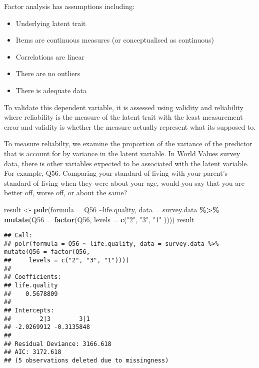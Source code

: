 \documentclass[
]{article}
\newenvironment{Shaded}{\begin{snugshade}}{\end{snugshade}}
\newcommand{\AttributeTok}[1]{\textcolor[rgb]{0.13,0.29,0.53}{#1}}
\newcommand{\FunctionTok}[1]{\textcolor[rgb]{0.13,0.29,0.53}{\textbf{#1}}}
\newcommand{\NormalTok}[1]{#1}
\newcommand{\OtherTok}[1]{\textcolor[rgb]{0.56,0.35,0.01}{#1}}
\newcommand{\SpecialCharTok}[1]{\textcolor[rgb]{0.81,0.36,0.00}{\textbf{#1}}}
\newcommand{\StringTok}[1]{\textcolor[rgb]{0.31,0.60,0.02}{#1}}
\begin{document}
Factor analysis has assumptions including:

\begin{itemize}
\item
  Underlying latent trait
\item
  Items are continuous measures (or conceptualised as continuous)
\item
  Correlations are linear
\item
  There are no outliers
\item
  There is adequate data
\end{itemize}

To validate this dependent variable, it is assessed using validity and
reliability where reliability is the measure of the latent trait with
the least measurement error and validity is whether the measure actually
represent what its supposed to.

To measure reliabilty, we examine the proportion of the variance of the
predictor that is account for by variance in the latent variable. In
World Values survey data, there is other variables expected to be
associated with the latent variable. For example, Q56. Comparing your
standard of living with your parent's standard of living when they were
about your age, would you say that you are better off, worse off, or
about the same?

\begin{Shaded}
\begin{Highlighting}[]
\NormalTok{result }\OtherTok{\textless{}{-}} \FunctionTok{polr}\NormalTok{(}\AttributeTok{formula =}\NormalTok{ Q56 }\SpecialCharTok{\textasciitilde{}}\NormalTok{life.quality, }\AttributeTok{data =}\NormalTok{ survey.data }\SpecialCharTok{\%\textgreater{}\%} \FunctionTok{mutate}\NormalTok{(}\AttributeTok{Q56 =} \FunctionTok{factor}\NormalTok{(Q56, }\AttributeTok{levels =} \FunctionTok{c}\NormalTok{(}\StringTok{"2"}\NormalTok{, }\StringTok{"3"}\NormalTok{, }\StringTok{"1"}\NormalTok{ ))))}
\NormalTok{result}
\end{Highlighting}
\end{Shaded}

\begin{verbatim}
## Call:
## polr(formula = Q56 ~ life.quality, data = survey.data %>% mutate(Q56 = factor(Q56, 
##     levels = c("2", "3", "1"))))
## 
## Coefficients:
## life.quality 
##    0.5678809 
## 
## Intercepts:
##        2|3        3|1 
## -2.0269912 -0.3135848 
## 
## Residual Deviance: 3166.618 
## AIC: 3172.618 
## (5 observations deleted due to missingness)
\end{verbatim}
\end{document}
